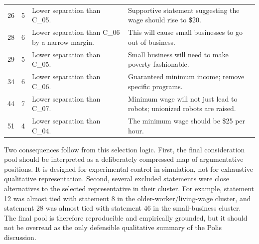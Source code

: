 \begin{longtable}{p{0.38in}p{0.42in}p{1.40in}p{3.80in}}
26 & 5 & Lower separation than C\_05. & Supportive statement suggesting the wage should rise to \$20. \\
28 & 6 & Lower separation than C\_06 by a narrow margin. & This will cause small businesses to go out of business. \\
29 & 5 & Lower separation than C\_05. & Small business will need to make poverty fashionable. \\
34 & 6 & Lower separation than C\_06. & Guaranteed minimum income; remove specific programs. \\
44 & 7 & Lower separation than C\_07. & Minimum wage will not just lead to robots; unionized robots are raised. \\
51 & 4 & Lower separation than C\_04. & The minimum wage should be \$25 per hour. \\
\end{longtable}
\endgroup

Two consequences follow from this selection logic. First, the final
consideration pool should be interpreted as a deliberately compressed map of
argumentative positions. It is designed for experimental control in simulation,
not for exhaustive qualitative representation. Second, several excluded
statements were close alternatives to the selected representative in their
cluster. For example, statement 12 was almost tied with statement 8 in the
older-worker/living-wage cluster, and statement 28 was almost tied with
statement 46 in the small-business cluster. The final pool is therefore
reproducible and empirically grounded, but it should not be overread as the
only defensible qualitative summary of the Polis discussion.
